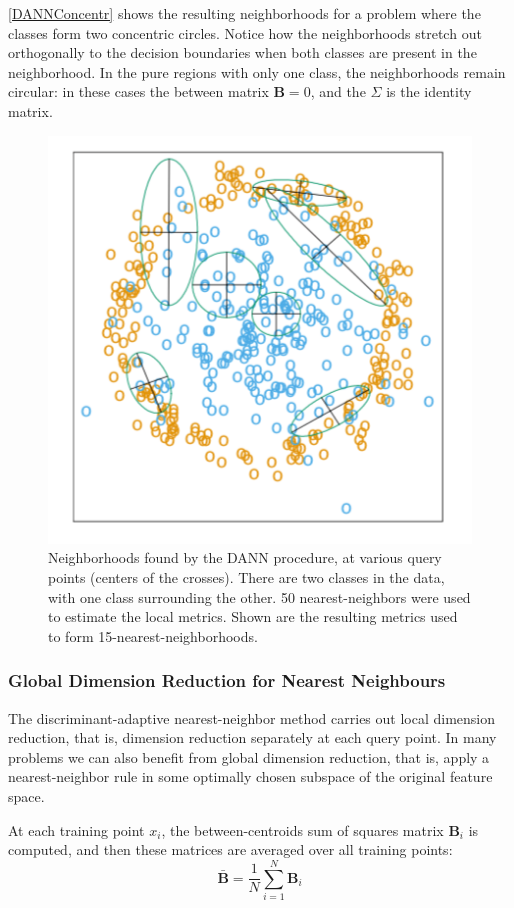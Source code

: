 \documentclass[12pt, letterpaper]{article}
\theoremstyle{definition}
\begin{document}
\autoref{DANNConcentr} shows the resulting neighborhoods for a problem where the classes form two concentric circles. Notice how the neighborhoods stretch out orthogonally to the decision boundaries when both classes are present in the neighborhood. In the pure regions with only one class, the neighborhoods remain circular: in these cases the between matrix $\mathbf{B} = 0$, and the $\Sigma$ is the identity matrix.
\begin{figure}
\centering
\includegraphics[scale=0.7]{img/DANNConcentr}
\caption{ Neighborhoods found by the DANN procedure, at various query points (centers of the crosses). There are two classes in the data, with one class surrounding the other. 50 nearest-neighbors were used to estimate the local metrics. Shown are the resulting metrics used to form 15-nearest-neighborhoods.}
\label{DANNConcentr}
\end{figure}

\subsubsection{Global Dimension Reduction for Nearest Neighbours}
The discriminant-adaptive nearest-neighbor method carries out local dimension reduction, that is, dimension reduction separately at each query point. In many problems we can also benefit from global dimension reduction, that is, apply a nearest-neighbor rule in some optimally chosen subspace of the original feature space.

At each training point $x_i$, the between-centroids sum of squares matrix $\mathbf{B}_i$ is computed, and then these matrices are averaged over all training points:
\begin{equation}
\bar{\mathbf{B}} = \frac{1}{N} \sum_{i=1}^N \mathbf{B}_i
\end{equation}
\end{document}
